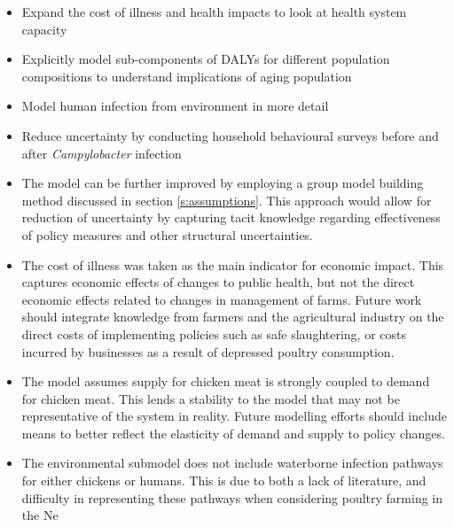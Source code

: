 \begin{itemize}
    \item Expand the cost of illness and health impacts to look at health system capacity
    \item Explicitly model sub-components of DALYs for different population compositions to understand implications of aging population
    \item Model human infection from environment in more detail
    \item Reduce uncertainty by conducting household behavioural surveys before and after \textit{Campylobacter} infection
    \item The model can be further improved by employing a group model building method discussed in section \ref{s:assumptions}. This approach would allow for reduction of uncertainty by capturing tacit knowledge regarding effectiveness of policy measures and other structural uncertainties.
    \item The cost of illness was taken as the main indicator for economic impact. This captures economic effects of changes to public health, but not the direct economic effects related to changes in management of farms. Future work should integrate knowledge from farmers and the agricultural industry on the direct costs of implementing policies such as safe slaughtering, or costs incurred by businesses as a result of depressed poultry consumption.
    \item The model assumes supply for chicken meat is strongly coupled to demand for chicken meat. This lends a stability to the model that may not be representative of the system in reality. Future modelling efforts should include means to better reflect the elasticity of demand and supply to policy changes.
    \item The environmental submodel does not include waterborne infection pathways for either chickens or humans. This is due to both a lack of literature, and difficulty in representing these pathways when considering poultry farming in the Ne 
\end{itemize}

